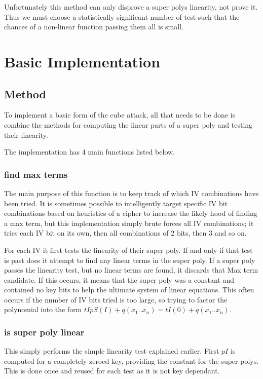 \documentclass{report}
\begin{document}
Unfortunately this method can only disprove a super polys linearity, not prove it. Thus we must choose a statistically significant number of test such that the chances of a non-linear function passing them all is small.%

\section{Basic Implementation}
\subsection{Method}
To implement a basic form of the cube attack, all that needs to be done is combine the methods for computing the linear parts of a super poly and testing their linearity.

The implementation has 4 main functions listed below.

\subsubsection{find max terms}
The main purpose of this function is to keep track of which IV combinations have been tried. It is sometimes possible to intelligently target specific IV bit combinations based on heuristics of a cipher to increase the likely hood of finding a max term, but this implementation simply brute forces all IV combinations; it tries each IV bit on its own, then all combinations of 2 bits, then 3 and so on.

For each IV it first tests the linearity of their super poly. If and only if that test is past does it attempt to find any linear terms in the super poly. If a super poly passes the linearity test, but no linear terms are found, it discards that Max term candidate. If this occurs, it means that the super poly was a constant and contained no key bits to help the ultimate system of linear equations. This often occurs if the number of IV bits tried is too large, so trying to factor the polynomial into the form $tIpS(I)+q(x_1..x_n)=tI(0)+q(x_1..x_n)$.

\subsubsection{is super poly linear}
This simply performs the simple linearity test explained earlier. First $pI$ is computed for a completely zeroed key, providing the constant for the super polys. This is done once and reused for each test as it is not key dependant.
\end{document}

